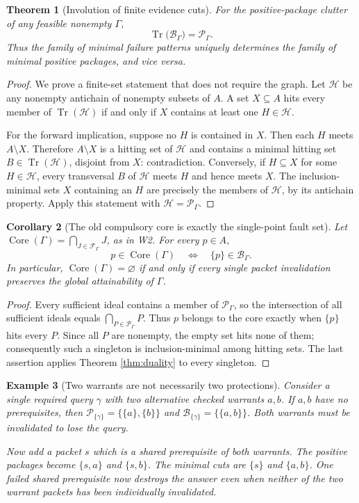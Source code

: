 \documentclass[11pt,letterpaper]{article}
\newtheorem{theorem}{Theorem}[section]
\newtheorem{corollary}[theorem]{Corollary}
\newtheorem{example}[theorem]{Example}
\DeclareMathOperator{\Tr}{Tr}
\DeclareMathOperator{\Core}{Core}
\newcommand{\calP}{\mathcal P}
\newcommand{\calB}{\mathcal B}
\newcommand{\Gam}{\Gamma}
\begin{document}
\begin{theorem}[Involution of finite evidence cuts]\label{thm:involution}
For the positive-package clutter of any feasible nonempty $\Gam$,
\[
\Tr\bigl(\calB_\Gam\bigr)=\calP_\Gam.
\tag{3}\label{eq:involution}
\]
Thus the family of minimal failure patterns uniquely determines the family of minimal positive packages, and vice versa.
\end{theorem}
\begin{proof}
We prove a finite-set statement that does not require the graph. Let $\mathcal H$ be any nonempty antichain of nonempty subsets of $A$. A set $X\subseteq A$ hits every member of $\Tr(\mathcal H)$ if and only if $X$ contains at least one $H\in\mathcal H$.

For the forward implication, suppose no $H$ is contained in $X$. Then each $H$ meets $A\setminus X$. Therefore $A\setminus X$ is a hitting set of $\mathcal H$ and contains a minimal hitting set $B\in\Tr(\mathcal H)$, disjoint from $X$: contradiction. Conversely, if $H\subseteq X$ for some $H\in\mathcal H$, every transversal $B$ of $\mathcal H$ meets $H$ and hence meets $X$. The inclusion-minimal sets $X$ containing an $H$ are precisely the members of $\mathcal H$, by its antichain property. Apply this statement with $\mathcal H=\calP_\Gam$.
\end{proof}

\begin{corollary}[The old compulsory core is exactly the single-point fault set]\label{cor:core}
Let $\Core(\Gam)=\bigcap_{J\in\mathcal F_\Gam}J$, as in W2. For every $p\in A$,
\[
p\in\Core(\Gam)\quad\Longleftrightarrow\quad \{p\}\in\calB_\Gam.
\tag{4}\label{eq:core}
\]
In particular, $\Core(\Gam)=\varnothing$ if and only if \emph{every single packet invalidation} preserves the global attainability of $\Gam$.
\end{corollary}
\begin{proof}
Every sufficient ideal contains a member of $\calP_\Gam$, so the intersection of all sufficient ideals equals $\bigcap_{P\in\calP_\Gam}P$. Thus $p$ belongs to the core exactly when $\{p\}$ hits every $P$. Since all $P$ are nonempty, the empty set hits none of them; consequently such a singleton is inclusion-minimal among hitting sets. The last assertion applies Theorem \ref{thm:duality} to every singleton.
\end{proof}

\begin{example}[Two warrants are not necessarily two protections]\label{ex:shared}
Consider a single required query $\gamma$ with two alternative checked warrants $a,b$. If $a,b$ have no prerequisites, then $\calP_{\{\gamma\}}=\{\{a\},\{b\}\}$ and $\calB_{\{\gamma\}}=\{\{a,b\}\}$. Both warrants must be invalidated to lose the query.

Now add a packet $s$ which is a shared prerequisite of both warrants. The positive packages become $\{s,a\}$ and $\{s,b\}$. The minimal cuts are $\{s\}$ and $\{a,b\}$. One failed shared prerequisite now destroys the answer even when neither of the two warrant packets has been individually invalidated.
\end{example}
\end{document}

